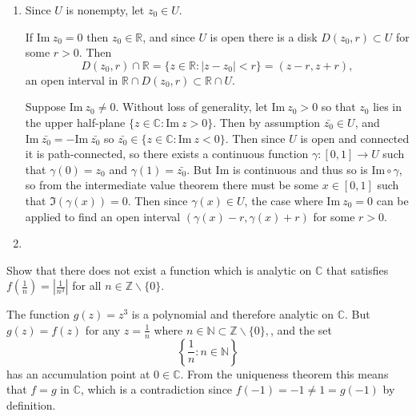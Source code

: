 \documentclass{article}
\newcounter{Problem}
\newenvironment{Problem}{\begin{Exercise}[name={Problem},
                                          counter={Problem}]}
                        {\end{Exercise}}
\begin{document}
\begin{Answer}
  \begin{enumerate}
    \item{
      Since $U$ is nonempty, let $z_0 \in U$.

      If $\mathrm{Im}~z_0 = 0$
      then $z_0 \in \mathbb{R}$, and since $U$ is open there is a disk
      $D(z_0, r) \subset U$ for some $r > 0$. Then
      $$
        D(z_0, r) \cap \mathbb{R}
      = \{ z \in \mathbb{R} : |z - z_0| < r \}
      = (z-r, z+r),
      $$
      an open interval in
      $\mathbb{R} \cap D(z_0, r) \subset \mathbb{R} \cap U$.

      Suppose $\mathrm{Im}~z_0 \neq 0$. Without loss of generality,
      let $\mathrm{Im}~z_0 > 0$ so that $z_0$ lies in the upper half-plane
      $\{ z \in \mathbb{C} : \mathrm{Im}~z > 0 \}$. Then
      by assumption $\bar{z_0} \in U$, and
      $\mathrm{Im}~\bar{z_0} = -\mathrm{Im}~\bar{z_0}$ so
      $\bar{z_0} \in \{ z \in \mathbb{C} : \mathrm{Im}~z < 0 \}$.
      Then since $U$ is open and connected it is path-connected, so
      there exists a continuous function $\gamma: [0, 1] \to U$ such
      that $\gamma(0) = z_0$ and $\gamma(1) = \bar{z_0}$. But
      $\mathrm{Im}$ is continuous and thus so is
      $\mathrm{Im} \circ \gamma$, so from the intermediate value
      theorem there must be some $x \in [0, 1]$ such that
      $\Im(\gamma(x)) = 0$. Then since $\gamma(x) \in U$, the case
      where $\mathrm{Im}~z_0 = 0$ can be applied to find an open
      interval $(\gamma(x) - r, \gamma(x) + r)$ for some $r > 0$.
    }
    \item{

    }
  \end{enumerate}
\end{Answer}

\begin{Problem}
  Show that there does not exist a function which is analytic on
  $\mathbb{C}$ that satisfies
  $f\left(\frac{1}{n}\right) = \left|\frac{1}{n^3}\right|$ for all
  $n \in \mathbb{Z} \backslash \{ 0 \}$.
\end{Problem}

\begin{Answer}
  The function $g(z) = z^3$ is a polynomial and therefore analytic
  on $\mathbb{C}$. But $g(z) = f(z)$ for any $z = \frac{1}{n}$ where
  $n \in \mathbb{N} \subset \mathbb{Z} \backslash \{0\},$, and the set
  $$
  \left\{\frac{1}{n} : n \in \mathbb{N} \right\}
  $$
  has an accumulation point at $0 \in \mathbb{C}$. From the uniqueness theorem
  this means that $f = g$ in $\mathbb{C}$, which is a contradiction
  since $f(-1) = -1 \neq 1 = g(-1)$ by definition.
\end{Answer}
\end{document}
